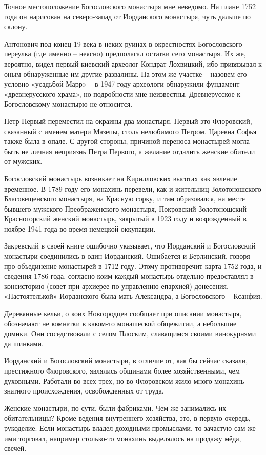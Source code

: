 Точное местоположение Богословского монастыря мне неведомо. На плане 1752 года он нарисован на северо-запад от Иорданского монастыря, чуть дальше по склону.

Антонович под конец 19 века в неких руинах в окрестностях Богословского переулка (где именно – неясно) предполагал остатки сего монастыря. Их же, вероятно, видел первый киевский археолог Кондрат Лохвицкий, ибо привязывал к оным обнаруженные им другие развалины. На этом же участке – назовем его условно «усадьбой Марр» – в 1947 году археологи обнаружили фундамент «древнерусского храма», но подробности мне неизвестны. Древнерусское к Богословскому монастырю не относится.

Петр Первый переместил на окраины два монастыря. Первый это Флоровский, связанный с именем матери Мазепы, столь нелюбимого Петром. Царевна Софья также была в опале. С другой стороны, причиной переноса монастырей могла быть не личная неприязнь Петра Первого, а желание отдалить женские обители от мужских.

Богословский монастырь возникает на Кирилловских высотах как явление временное. В 1789 году его монахинь перевели, как и жительниц Золотоношского Благовещенского монастыря, на  Красную горку, и там образовался, на месте бывшего мужского Преображенского монастыря, Покровский Золотоношский Красногорский женский монастырь, закрытый в 1923 году и возрожденный в ноябре 1941 года во время немецкой оккупации. 

Закревский в своей книге ошибочно указывает, что Иорданский и Богословский монастыри соединились в один Иорданский. Ошибается и Берлинский, говоря про объединение монастырей в 1712 году. Этому противоречит карта 1752 года, и сведения 1786 года, согласно коим каждый монастырь отдельно предоставлял в консисторию (совет при архиерее по управлению епархией) донесения. «Настоятелькой» Иорданского была мать Александра, а Богословского – Ксанфия.

Деревянные кельи, о коих Новгородцев сообщает при описании монастыря, обозначают не комнатки в каком-то монашеской общежитии, а небольшие домики. Они соседствовали с селом Плоским, славящимся своими винокурнями да шинками.

Иорданский и Богословский монастыри, в отличие от, как бы сейчас сказали, престижного Флоровского, являлись общинами более хозяйственными, чем духовными. Работали во всех трех, но во Флоровском жило много монахинь знатного происхождения, освобожденных от труда. 

Женские монастыри, по сути, были фабриками. Чем же занимались их обитательницы? Кроме ведения внутреннего хозяйства, это, в первую очередь, рукоделие. Если монастырь владел доходными промыслами, то зачастую сам же ими торговал, например столько-то монахинь выделялось на продажу мёда, свечей. 

